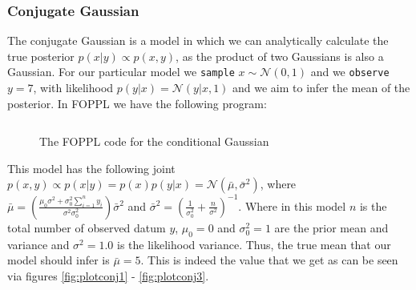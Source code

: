 \documentclass[twoside]{article}
\begin{document}
\subsubsection{Conjugate Gaussian}
The conjugate Gaussian is a model in which we can analytically calculate the true posterior $p(x | y) \propto p(x,y) $, as the product of two Gaussians is also a Gaussian. For our particular model we \texttt{sample} $x \sim \mathcal{N}(0, 1)$ and we \texttt{observe} $y = 7$, with likelihood $p(y|x) = \mathcal{N}(y | x, 1)$ and we aim to infer the mean of the posterior.  In FOPPL we have the following program:
\inputminted{clojure}{code/conjugategauss.clj}
\begin{figure}[ht]
	\begin{center}
		
	\end{center}
	\caption{The FOPPL code for the conditional Gaussian}
\end{figure}
This model has the following joint $ p(x,y) \propto p(x|y) = p(x)p(y| x) = \mathcal{N}(\bar{\mu}, \bar{\sigma}^{2})$, where $\bar{\mu} = \left(\frac{\mu_{0}\sigma^{2} + \sigma^{2}_{0}\sum_{i=1}^{n}y_{i}}{\sigma^{2}\sigma^{2}_{0}}\right) \bar{\sigma}^{2}$ and $\bar{\sigma}^{2} = \left(\frac{1}{\sigma^{2}_{0}} + \frac{n}{\sigma^{2}}\right)^{-1} $. Where in this model $n$ is the total number of observed datum $y$, $\mu_{0} = 0 $ and $\sigma_{0}^{2} = 1$ are the prior mean and variance and $\sigma^{2} = 1.0 $ is the likelihood variance. Thus, the true mean that our model should infer is $\bar{\mu} = 5$. This is indeed the value that we get as can be seen via figures \ref{fig:plotconj1} - \ref{fig:plotconj3}.
\end{document}
